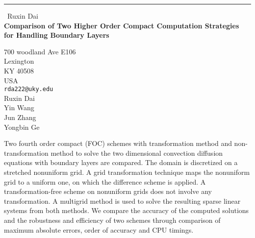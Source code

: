 \documentclass{report}
\begin{document}
\begin{center}
\rule{6in}{1pt} \
{\large Ruxin Dai \\
{\bf Comparison of Two Higher Order Compact Computation Strategies for Handling Boundary Layers}}

700 woodland Ave E106 \\ Lexington \\ KY 40508 \\ USA
\\
{\tt rda222@uky.edu}\\
Ruxin Dai\\
Yin Wang\\
Jun Zhang\\
Yongbin Ge\end{center}

Two fourth order compact (FOC) schemes with transformation method and
non-transformation method to solve the two dimensional convection
diffusion equations with boundary layers are compared. The domain is
discretized on a stretched nonuniform grid. A grid transformation
technique maps the nonuniform grid to a uniform one, on which the
difference scheme is applied. A transformation-free scheme on nonuniform
grids does not involve any transformation. A multigrid method is used to
solve the resulting sparse linear systems from both methods. We compare
the accuracy of the computed solutions and the robustness and efficiency
of two schemes through comparison of maximum absolute errors, order of
accuracy and CPU timings.
\end{document}
